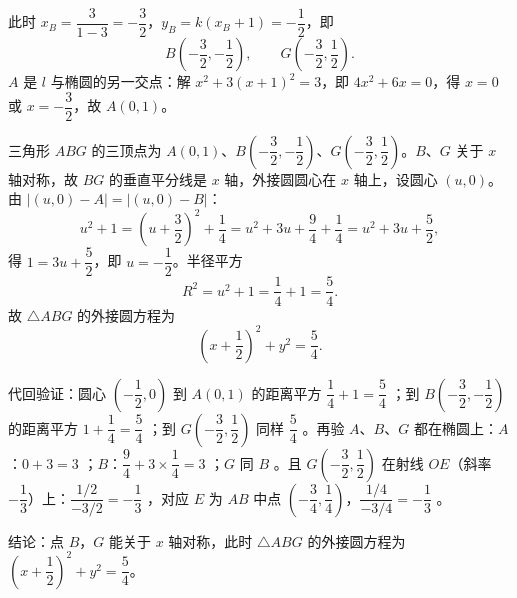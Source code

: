 \begin{answer}
此时 $x_B=\dfrac{3}{1-3}=-\dfrac32$，$y_B=k(x_B+1)=-\dfrac12$，即
\nopagebreak[4]
\[
B\left(-\frac32,-\frac12\right),\qquad G\left(-\frac32,\frac12\right).
\]
$A$ 是 $l$ 与椭圆的另一交点：解 $x^2+3(x+1)^2=3$，即 $4x^2+6x=0$，得 $x=0$ 或 $x=-\dfrac32$，故 $A(0,1)$。

三角形 $ABG$ 的三顶点为 $A(0,1)$、$B\left(-\dfrac32,-\dfrac12\right)$、$G\left(-\dfrac32,\dfrac12\right)$。$B$、$G$ 关于 $x$ 轴对称，故 $BG$ 的垂直平分线是 $x$ 轴，外接圆圆心在 $x$ 轴上，设圆心 $(u,0)$。由 $|(u,0)-A|=|(u,0)-B|$：
\nopagebreak[4]
\[
u^2+1=\left(u+\frac32\right)^2+\frac14=u^2+3u+\frac94+\frac14=u^2+3u+\frac52,
\]
得 $1=3u+\dfrac52$，即 $u=-\dfrac12$。半径平方
\nopagebreak[4]
\[
R^2=u^2+1=\frac14+1=\frac54.
\]
故 $\triangle ABG$ 的外接圆方程为
\nopagebreak[4]
\[
\left(x+\frac12\right)^2+y^2=\frac54.
\]

代回验证：圆心 $\left(-\dfrac12,0\right)$ 到 $A(0,1)$ 的距离平方 $\dfrac14+1=\dfrac54$ ；到 $B\left(-\dfrac32,-\dfrac12\right)$ 的距离平方 $1+\dfrac14=\dfrac54$ ；到 $G\left(-\dfrac32,\dfrac12\right)$ 同样 $\dfrac54$ 。再验 $A$、$B$、$G$ 都在椭圆上：$A$：$0+3=3$ ；$B$：$\dfrac94+3\times\dfrac14=3$ ；$G$ 同 $B$ 。且 $G\left(-\dfrac32,\dfrac12\right)$ 在射线 $OE$（斜率 $-\dfrac13$）上：$\dfrac{1/2}{-3/2}=-\dfrac13$ ，对应 $E$ 为 $AB$ 中点 $\left(-\dfrac34,\dfrac14\right)$，$\dfrac{1/4}{-3/4}=-\dfrac13$ 。

结论：点 $B$，$G$ 能关于 $x$ 轴对称，此时 $\triangle ABG$ 的外接圆方程为 $\left(x+\dfrac12\right)^2+y^2=\dfrac54$。



\end{answer}